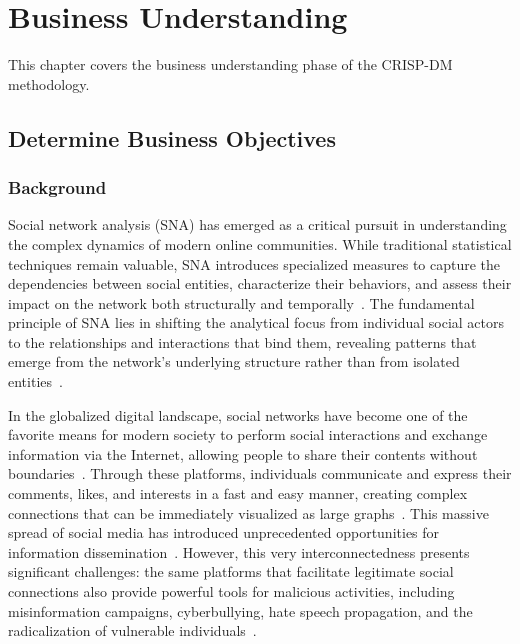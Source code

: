 
\chapter{Business Understanding}
\label{cha:businessunderstanding}

This chapter covers the business understanding phase of the CRISP-DM methodology.

\section{Determine Business Objectives}

\subsection*{Background}
Social network analysis (SNA) has emerged as a critical pursuit in understanding the complex dynamics of modern online communities. While traditional statistical techniques remain valuable, SNA introduces specialized measures to capture the dependencies between social entities, characterize their behaviors, and assess their impact on the network both structurally and temporally~\cite{tabassumSocialNetworkAnalysis2018}. The fundamental principle of SNA lies in shifting the analytical focus from individual social actors to the relationships and interactions that bind them, revealing patterns that emerge from the network's underlying structure rather than from isolated entities~\cite{tabassumSocialNetworkAnalysis2018}.

In the globalized digital landscape, social networks have become one of the favorite means for modern society to perform social interactions and exchange information via the Internet, allowing people to share their contents without boundaries~\cite{daudApplicationsLinkPrediction2020,pellicaniSAIRUSSpatiallyawareIdentification2023}. Through these platforms, individuals communicate and express their comments, likes, and interests in a fast and easy manner, creating complex connections that can be immediately visualized as large graphs~\cite{daudApplicationsLinkPrediction2020}. This massive spread of social media has introduced unprecedented opportunities for information dissemination~\cite{khanGraphNeuralNetworks2024}. However, this very interconnectedness presents significant challenges: the same platforms that facilitate legitimate social connections also provide powerful tools for malicious activities, including misinformation campaigns, cyberbullying, hate speech propagation, and the radicalization of vulnerable individuals~\cite{benedettiMultiviewLearningIdentification2025,pellicaniSAIRUSSpatiallyawareIdentification2023,khanGraphNeuralNetworks2024,benedettiIMMENSEInductiveMultiperspective2025}.

